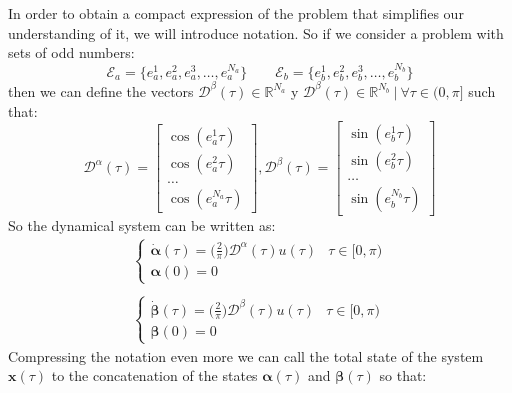 In order to obtain a compact expression of the problem that simplifies our understanding of it, we will introduce notation.
%
So if we consider a problem with sets of odd numbers:
\begin{equation}
    \mathcal{E}_a = \{e_a^1,e_a^2,e_a^3,\dots,e_a^{N_a}\} \hspace{2em} \mathcal{E}_b = \{e_b^1,e_b^2,e_b^3,\dots,e_b^{N_b}\}    
\end{equation}
%
then we can define the vectors $\bm{\mathcal{D}}^\beta(\tau) \in \mathbb{R}^{N_a} $ y $ \bm{\mathcal{D}}^\beta(\tau) \in \mathbb{R}^{N_b} \ | \ \forall \tau \in (0,\pi]$ such that:
\begin{equation}
    \bm{\mathcal{D}}^\alpha(\tau) = 
        \begin{bmatrix} 
        \cos(e_a^1\tau) \\
        \cos(e_a^2\tau) \\
        \dots           \\
        \cos(e_a^{N_a}\tau) 
    \end{bmatrix},
    \bm{\mathcal{D}}^\beta(\tau) = 
    \begin{bmatrix} 
    \sin(e_b^1\tau) \\
    \sin(e_b^2\tau) \\
    \dots           \\
    \sin(e_b^{N_b}\tau) 
    \end{bmatrix} 
\end{equation}
%
So the dynamical system can be written as:
\begin{equation}
    \begin{aligned}
        \begin{cases}
            \dot{\bm{\alpha}}(\tau) = \big(\frac{2}{\pi}\big)\bm{\mathcal{D}}^\alpha(\tau) u(\tau) & \tau \in [0,\pi)\\
            \bm{\alpha}(0) = 0
        \end{cases} \\ \\
        \begin{cases}
            \dot{\bm{\beta}}(\tau)  = \big(\frac{2}{\pi}\big)\bm{\mathcal{D}}^\beta(\tau) u(\tau) & \tau \in [0,\pi) \\
            \bm{\beta}(0) = 0
        \end{cases}
    \end{aligned}
\end{equation}
Compressing the notation even more we can call the total state of the system $ \bm {x} (\tau) $ to the concatenation of the states $ \bm {\alpha} (\tau) $ and $ \bm {\beta} ( \tau) $ so that:
